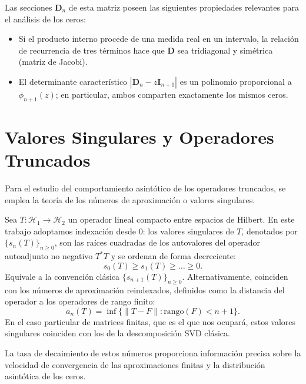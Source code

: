 Las secciones $\mathbf{D}_n$ de esta matriz poseen las siguientes propiedades relevantes para el análisis de los ceros:

\begin{itemize}
	\item Si el producto interno procede de una medida real en un intervalo, la relación de recurrencia de tres términos hace que $\mathbf{D}$ sea tridiagonal y simétrica (matriz de Jacobi).
	\item El determinante característico $|\mathbf{D}_n - z\mathbf{I}_{n+1}|$ es un polinomio proporcional a $\phi_{n+1}(z)$; en particular, ambos comparten exactamente los mismos ceros.
\end{itemize}

\section{Valores Singulares y Operadores Truncados}

Para el estudio del comportamiento asintótico de los operadores truncados, se emplea la teoría de los números de aproximación o valores singulares.

\begin{defn}
	Sea $T: \mathcal{H}_1 \to \mathcal{H}_2$ un operador lineal compacto entre espacios de Hilbert. En este trabajo adoptamos indexación desde $0$: los valores singulares de $T$, denotados por $\{s_n(T)\}_{n \geq 0}$, son las raíces cuadradas de los autovalores del operador autoadjunto no negativo $T^*T$ y se ordenan de forma decreciente:
	\begin{equation}
		s_0(T) \geq s_1(T) \geq \dots \geq 0.
	\end{equation}
	Equivale a la convención clásica $\{s_{n+1}(T)\}_{n\ge0}$. Alternativamente, coinciden con los números de aproximación reindexados, definidos como la distancia del operador a los operadores de rango finito:
	\begin{equation}
		a_n(T) = \inf \{ \|T - F\| : \text{rango}(F) < n+1 \}.
	\end{equation}
	En el caso particular de matrices finitas, que es el que nos ocupará, estos valores singulares coinciden con los de la descomposición SVD clásica.
\end{defn}

La tasa de decaimiento de estos números proporciona información precisa sobre la velocidad de convergencia de las aproximaciones finitas y la distribución asintótica de los ceros.

